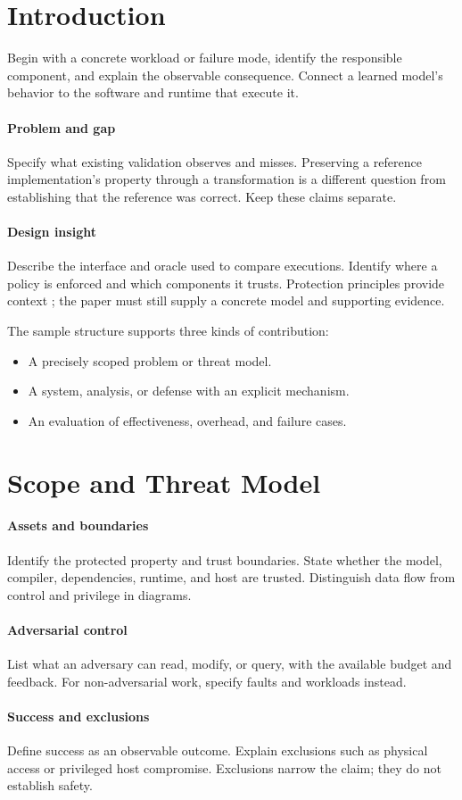 \section{Introduction}
\label{sec:introduction}
Begin with a concrete workload or failure mode, identify the responsible
component, and explain the observable consequence. Connect a learned
model's behavior to the software and runtime that execute it.

\paragraph{Problem and gap}
Specify what existing validation observes and misses. Preserving a reference
implementation's property through a transformation is a different question
from establishing that the reference was correct. Keep these claims separate.

\paragraph{Design insight}
Describe the interface and oracle used to compare executions. Identify
where a policy is enforced and which components it trusts. Protection
principles provide context \citep{saltzer1975}; the paper must still supply
a concrete model and supporting evidence.

The sample structure supports three kinds of contribution:
\begin{itemize}
  \item A precisely scoped problem or threat model.
  \item A system, analysis, or defense with an explicit mechanism.
  \item An evaluation of effectiveness, overhead, and failure cases.
\end{itemize}

\section{Scope and Threat Model}
\label{sec:threat}
\paragraph{Assets and boundaries}
Identify the protected property and trust boundaries. State whether the
model, compiler, dependencies, runtime, and host are trusted. Distinguish
data flow from control and privilege in diagrams.

\paragraph{Adversarial control}
List what an adversary can read, modify, or query, with the available budget
and feedback. For non-adversarial work, specify faults and workloads instead.

\paragraph{Success and exclusions}
Define success as an observable outcome. Explain exclusions such as
physical access or privileged host compromise. Exclusions narrow the
claim; they do not establish safety.
